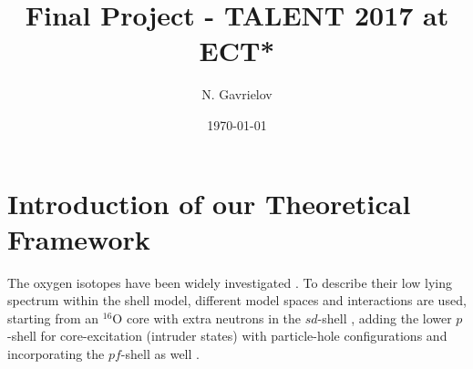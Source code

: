 \documentclass[aps,prl,reprint,groupedaddress]{revtex4-1}  %
\begin{document}
\title{Final Project - TALENT 2017 at ECT*}


\author{N. Gavrielov}
\affiliation{}


\date{\today}

\begin{abstract}
\end{abstract}

\pacs{}

\maketitle


\section{Introduction of our Theoretical Framework}

The oxygen isotopes have been widely investigated \citep[for a review see][]{Brown2017}. To describe their low lying spectrum within the shell model, different model spaces and interactions are used, starting from an $^{16}$O core with extra neutrons in the $sd$-shell \cite{Kuo1966,Wildenthal1984,Brown1988,Brown2006}, adding the lower $p$-shell for core-excitation (intruder states) with particle-hole configurations \cite{Lawson1976} and incorporating the $pf$-shell as well \cite{Utsuno1999}.
\end{document}
